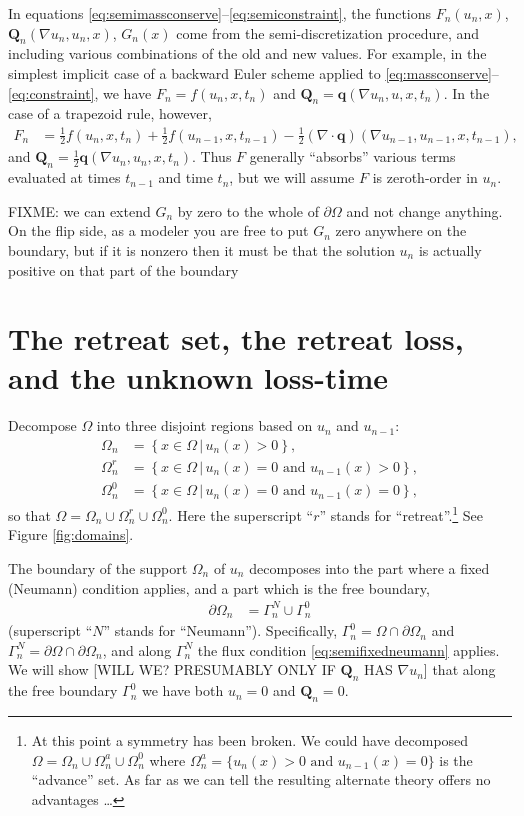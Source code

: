 \documentclass[final,leqno,onefignum,onetabnum]{siamltex1213bueler}
\newcommand\bq{\mathbf{q}}
\newcommand\bQ{\mathbf{Q}}
\newcommand{\Div}{\nabla\cdot}
\renewcommand{\grad}{\nabla}
\begin{document}
In equations  \eqref{eq:semimassconserve}--\eqref{eq:semiconstraint}, the functions $F_n(u_n,x)$, $\bQ_n(\grad u_n,u_n,x)$, $G_n(x)$ come from the semi-discretization procedure, and including various combinations of the old and new values.  For example, in the simplest implicit case of a backward Euler scheme applied to \eqref{eq:massconserve}--\eqref{eq:constraint}, we have $F_n = f(u_n,x,t_n)$ and $\bQ_n = \bq(\grad u_n,u,x,t_n)$.  In the case of a trapezoid rule, however,
\begin{align*}
F_n &= \frac{1}{2} f(u_n,x,t_n) + \frac{1}{2} f(u_{n-1},x,t_{n-1}) - \frac{1}{2} \left(\Div \bq\right)(\grad u_{n-1},u_{n-1},x,t_{n-1}),
\end{align*}
and $\bQ_n = \frac{1}{2} \bq(\grad u_n,u_n,x,t_n)$.  Thus $F$ generally ``absorbs'' various terms evaluated at times $t_{n-1}$ and time $t_n$, but we will assume $F$ is zeroth-order in $u_n$.

FIXME: we can extend $G_n$ by zero to the whole of $\partial \Omega$ and not change anything.  On the flip side, as a modeler you are free to put $G_n$ zero anywhere on the boundary, but if it is nonzero then it must be that the solution $u_n$ is actually positive on that part of the boundary


\section{The retreat set, the retreat loss, and the unknown loss-time}  Decompose $\Omega$ into three disjoint regions based on $u_n$ and $u_{n-1}$:
\begin{align*}
\Omega_n &= \left\{x \in \Omega \,\big|\, u_n(x)>0\right\}, \\
\Omega_n^r &= \left\{x \in \Omega \,\big|\, u_n(x)=0 \text{ and } u_{n-1}(x) > 0\right\}, \\
\Omega_n^0 &= \left\{x \in \Omega \,\big|\, u_n(x)=0 \text{ and } u_{n-1}(x) = 0\right\},
\end{align*}
so that $\Omega = \Omega_n \cup \Omega_n^r \cup \Omega_n^0$.  Here the superscript ``$r$'' stands for ``retreat''.\footnote{At this point a symmetry has been broken.  We could have decomposed $\Omega= \Omega_n \cup \Omega_n^a \cup \Omega_n^0$ where $\Omega_n^a = \{u_n(x) > 0 \text{ and } u_{n-1}(x) = 0\}$ is the ``advance'' set.  As far as we can tell the resulting alternate theory offers no advantages \dots}  See Figure \ref{fig:domains}.

The boundary of the support $\Omega_n$ of $u_n$ decomposes into the part where a fixed (Neumann) condition applies, and a part which is the free boundary,
\begin{align*}
\partial\Omega_n &= \Gamma_n^N \cup \Gamma_n^0
\end{align*}
(superscript ``$N$'' stands for ``Neumann'').  Specifically, $\Gamma_n^0 = \Omega \cap \partial \Omega_n$ and $\Gamma_n^N = \partial \Omega \cap \partial \Omega_n$, and along $\Gamma_n^N$ the flux condition \eqref{eq:semifixedneumann} applies.  We will show [WILL WE?  PRESUMABLY ONLY IF $\bQ_n$ HAS $\grad u_n$] that along the free boundary $\Gamma_n^0$ we have both $u_n=0$ and $\bQ_n = 0$.
\end{document}
